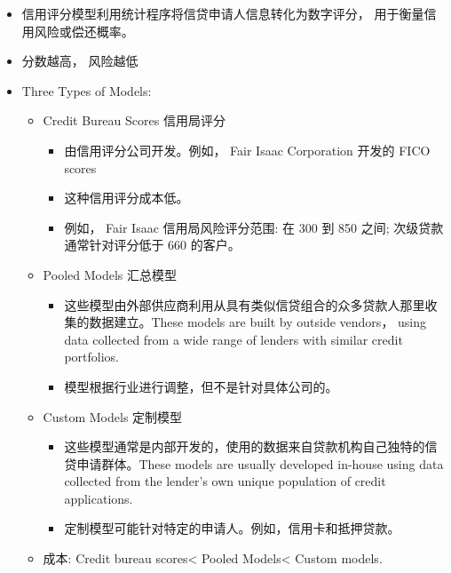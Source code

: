 \begin{itemize}
\item 信用评分模型利用统计程序将信贷申请人信息转化为数字评分， 用于衡量信用风险或偿还概率。

\item 分数越高， 风险越低

\item Three Types of Models:

\begin{itemize}
\item Credit Bureau Scores 信用局评分
\begin{itemize}

    \item 由信用评分公司开发。例如， Fair Isaac Corporation 开发的 FICO scores

    \item 这种信用评分成本低。

    \item 例如， Fair Isaac 信用局风险评分范围: 在 300 到 850 之间; 次级贷款通常针对评分低于 660 的客户。
\end{itemize}

\item Pooled Models 汇总模型
\begin{itemize}

    \item 这些模型由外部供应商利用从具有类似信贷组合的众多贷款人那里收集的数据建立。These models are built by outside vendors， using data collected from a wide range of lenders with similar credit portfolios.

    \item 模型根据行业进行调整，但不是针对具体公司的。
\end{itemize}

\item Custom Models 定制模型
\begin{itemize}

    \item 这些模型通常是内部开发的，使用的数据来自贷款机构自己独特的信贷申请群体。These models are usually developed in-house using data collected from the lender's own unique population of credit applications.

    \item 定制模型可能针对特定的申请人。例如，信用卡和抵押贷款。
\end{itemize}

\item 成本: Credit bureau scores< Pooled Models< Custom models.




\end{itemize}
\end{itemize}
